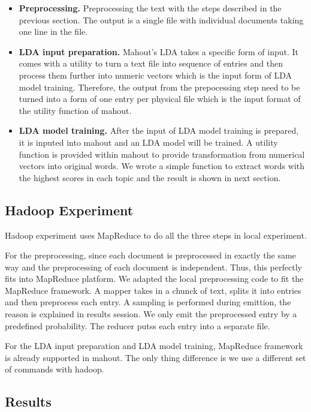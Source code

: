 \documentclass[conference]{IEEEtran}
\begin{document}
\begin{itemize}
	\item \textbf{Preprocessing.} Preprocessing the text with the steps described in the previous section. The output is a single file with individual documents taking one line in the file.
	\item \textbf{LDA input preparation.} Mahout's LDA takes a specific form of input. It comes with a utility to turn a text file into sequence of entries and then process them further into numeric vectors which is the input form of LDA model training. Therefore, the output from the prepocessing step need to be turned into a form of one entry per physical file which is the input format of the utility function of mahout.
	\item \textbf{LDA model training.} After the input of LDA model training is prepared, it is inputed into mahout and an LDA model will be trained. A utility function is provided within mahout to provide transformation from numerical vectors into original words. We wrote a simple function to extract words with the highest scores in each topic and the result is shown in next section.
\end{itemize}

\subsection{Hadoop Experiment}

Hadoop experiment uses MapReduce to do all the three steps in local experiment.

For the preprocessing, since each document is preprocessed in exactly the same way and the preprocessing of each document is independent. Thus, this perfectly fits into MapReduce platform. We adapted the local preprocessing code to fit the MapReduce framework. A mapper takes in a chunck of text, splits it into entries and then preprocess each entry. A sampling is performed during emittion, the reason is explained in results session. We only emit the preprocessed entry by a predefined probability. The reducer putss each entry into a separate file.

For the LDA input preparation and LDA model training, MapReduce framework is already supported in mahout. The only thing difference is we use a different set of commands with hadoop. 

\subsection{Results}
\end{document}
